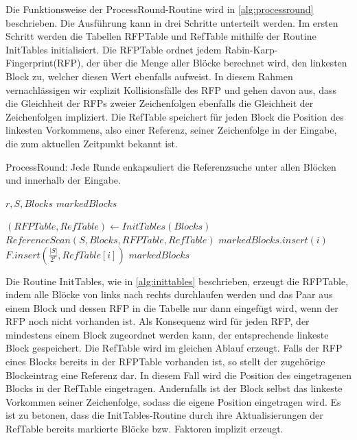 Die Funktionsweise der ProcessRound-Routine wird in \ref{alg:processround} beschrieben. Die Ausführung kann in drei Schritte unterteilt werden. Im ersten Schritt werden die Tabellen RFPTable und RefTable
mithilfe der Routine InitTables initialisiert. Die RFPTable ordnet jedem Rabin-Karp-Fingerprint(RFP), der über die Menge aller Blöcke berechnet wird, den linkesten Block zu, welcher diesen 
Wert ebenfalls aufweist. In diesem Rahmen vernachlässigen wir explizit Kollisionsfälle des RFP und gehen davon aus, dass die Gleichheit der RFPs zweier Zeichenfolgen ebenfalls die Gleichheit der Zeichenfolgen
impliziert. Die RefTable speichert für jeden Block die Position des linkesten Vorkommens, also einer Referenz, seiner Zeichenfolge in der Eingabe, die zum aktuellen Zeitpunkt bekannt ist.

\begin{algorithm}[ht]
    \centering
    \caption{ProcessRound: Jede Runde enkapsuliert die Referenzsuche unter allen Blöcken und innerhalb der Eingabe.} \label{alg:processround}
    \algorithmicrequire $r, S, Blocks$
    \algorithmicensure $markedBlocks$
    \begin{algorithmic}[1]
        \STATE $(RFPTable, RefTable) \gets InitTables(Blocks)$
        \STATE $ReferenceScan(S, Blocks, RFPTable, RefTable)$
                \STATE $markedBlocks.insert(i)$
                \STATE $F.insert(\frac{|S|}{2^r}, RefTable[i])$ 
            \ENDIF
        \ENDFOR
        \RETURN $markedBlocks$
    \end{algorithmic}
\end{algorithm}

Die Routine InitTables, wie in \ref{alg:inittables} beschrieben, erzeugt die RFPTable, indem alle Blöcke von links nach rechts durchlaufen werden und das Paar aus einem Block und dessen RFP in die Tabelle
nur dann eingefügt wird, wenn der RFP noch nicht vorhanden ist. Als Konsequenz wird für jeden RFP, der mindestens einem Block zugeordnet werden kann, der entsprechende linkeste Block gespeichert. Die RefTable
wird im gleichen Ablauf erzeugt. Falls der RFP eines Blocks bereits in der RFPTable vorhanden ist, so stellt der zugehörige Blockeintrag eine Referenz dar. In diesem Fall wird die Position des eingetragenen Blocks
in der RefTable eingetragen. Andernfalls ist der Block selbst das linkeste Vorkommen seiner Zeichenfolge, sodass die eigene Position eingetragen wird. Es ist zu betonen, dass die InitTables-Routine durch ihre 
Aktualisierungen der RefTable bereits markierte Blöcke bzw. Faktoren implizit erzeugt.

